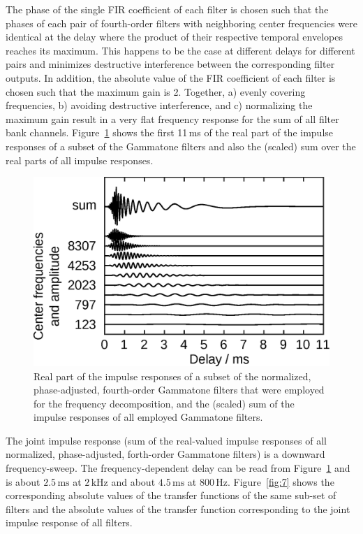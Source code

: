 \documentclass[10pt,a4paper,twocolumn]{article}
\begin{document}
%
The phase of the single FIR coefficient of each filter is chosen such that the phases of each pair of fourth-order filters with neighboring center frequencies were identical at the delay where the product of their respective temporal envelopes reaches its maximum.
%
This happens to be the case at different delays for different pairs and minimizes destructive interference between the corresponding filter outputs.
%
In addition, the absolute value of the FIR coefficient of each filter is chosen such that the maximum gain is 2.
%
Together, a) evenly covering frequencies, b) avoiding destructive interference, and c) normalizing the maximum gain result in a very flat frequency response for the sum of all filter bank channels.
%
Figure~\ref{fig:6} shows the first 11\,ms of the real part of the impulse responses of a subset of the Gammatone filters and also the (scaled) sum over the real parts of all impulse responses.
%
\begin{figure}
	\centerline{\includegraphics[width=.85\columnwidth]{images/gammatone_filter_responses}}
	\caption{Real part of the impulse responses of a subset of the normalized, phase-adjusted, fourth-order Gammatone filters that were employed for the frequency decomposition, and the (scaled) sum of the impulse responses of all employed Gammatone filters.}
	\label{fig:6}
\end{figure} 
%
The joint impulse response (sum of the real-valued impulse responses of all normalized, phase-adjusted, forth-order Gammatone filters) is a downward frequency-sweep.
%
The frequency-dependent delay can be read from Figure~\ref{fig:6} and is about $2.5\,\text{ms}$ at $2\,\text{kHz}$ and about $4.5\,\text{ms}$ at $800\,\text{Hz}$.
%
Figure~\ref{fig:7} shows the corresponding absolute values of the transfer functions of the same sub-set of filters and the absolute values of the transfer function corresponding to the joint impulse response of all filters.
\end{document}
